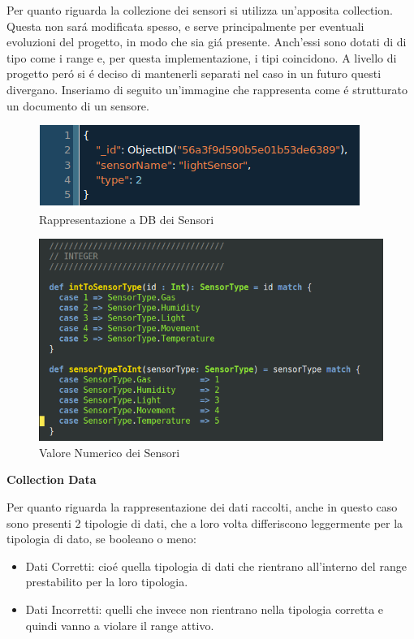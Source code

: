 Per quanto riguarda la collezione dei sensori si utilizza un'apposita collection. Questa non sar\'a modificata spesso, e serve principalmente per eventuali evoluzioni del progetto, in modo che sia gi\'a presente. Anch'essi sono dotati di di tipo come i range e, per questa implementazione, i tipi coincidono. A livello di progetto per\'o si \'e deciso di mantenerli separati nel caso in un futuro questi divergano. Inseriamo di seguito un'immagine che rappresenta come \'e strutturato un documento di un sensore.

\begin{figure}[ht]
\centering
\includegraphics[scale=0.5,natwidth=610,natheight=642]{Figures/DataStructures/SensorsValues.png}
\caption{Rappresentazione a DB dei Sensori}
\end{figure}


\begin{figure}[ht]
\centering
\includegraphics[scale=0.5,natwidth=610,natheight=642]{Figures/DataStructures/Sensors.png}
\caption{Valore Numerico dei Sensori}
\end{figure}

\afterpage{\clearpage}

\newpage

\begin{center}
\textbf{Collection Data}
\end{center}

Per quanto riguarda la rappresentazione dei dati raccolti, anche in questo caso sono presenti 2 tipologie di dati, che a loro volta differiscono leggermente per la tipologia di dato, se booleano o meno:
\begin{itemize}
\item Dati Corretti: cio\'e quella tipologia di dati che rientrano all'interno del range prestabilito per la loro tipologia.
\item Dati Incorretti: quelli che invece non rientrano nella tipologia corretta e quindi vanno a violare il range attivo.
\end{itemize}

